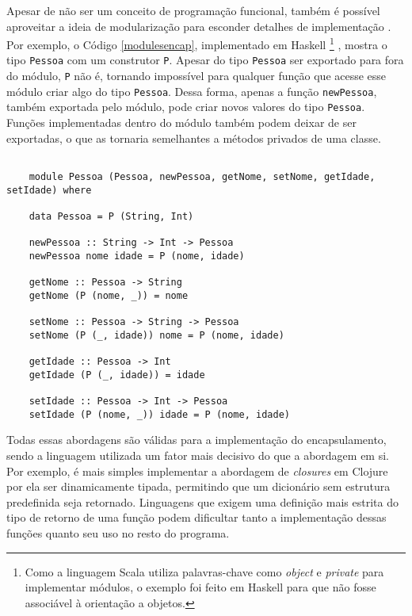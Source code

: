 Apesar de não ser um conceito de programação 
funcional, também é possível aproveitar a ideia 
de modularização para esconder detalhes de 
implementação \cite{mlmodules}. Por exemplo, o 
Código \ref{modulesencap}, implementado em 
Haskell
\footnote{
    Como a linguagem Scala utiliza palavras-chave 
    como \textit{object} e \textit{private} para 
    implementar módulos, o exemplo foi feito em 
    Haskell para que não fosse associável à 
    orientação a objetos.
}
, mostra o tipo \texttt{Pessoa} com um construtor 
\texttt{P}. Apesar do tipo \texttt{Pessoa} ser exportado para fora do 
módulo, \texttt{P} não é, tornando impossível para qualquer 
função que acesse esse módulo criar algo do tipo 
\texttt{Pessoa}. Dessa forma, apenas a função \texttt{newPessoa}, 
também exportada pelo módulo, 
pode criar novos valores do tipo 
\texttt{Pessoa}. Funções implementadas dentro do módulo 
também podem deixar de ser exportadas, o que 
as tornaria semelhantes a métodos privados 
de uma classe.

\begin{lstlisting}[caption={Módulos como forma de encapsulamento.},label=modulesencap]
    
    module Pessoa (Pessoa, newPessoa, getNome, setNome, getIdade, setIdade) where

    data Pessoa = P (String, Int)

    newPessoa :: String -> Int -> Pessoa
    newPessoa nome idade = P (nome, idade)

    getNome :: Pessoa -> String
    getNome (P (nome, _)) = nome

    setNome :: Pessoa -> String -> Pessoa
    setNome (P (_, idade)) nome = P (nome, idade)

    getIdade :: Pessoa -> Int
    getIdade (P (_, idade)) = idade

    setIdade :: Pessoa -> Int -> Pessoa
    setIdade (P (nome, _)) idade = P (nome, idade)

\end{lstlisting}

Todas essas abordagens são válidas para a 
implementação do encapsulamento, sendo a 
linguagem utilizada um fator mais decisivo 
do que a abordagem em si. Por exemplo, é 
mais simples implementar a abordagem de \textit{closures} 
em Clojure por ela ser dinamicamente tipada, 
permitindo que um dicionário sem estrutura 
predefinida seja retornado. Linguagens que exigem 
uma definição mais estrita do tipo de retorno 
de uma função podem dificultar tanto a 
implementação dessas funções quanto seu uso 
no resto do programa.

